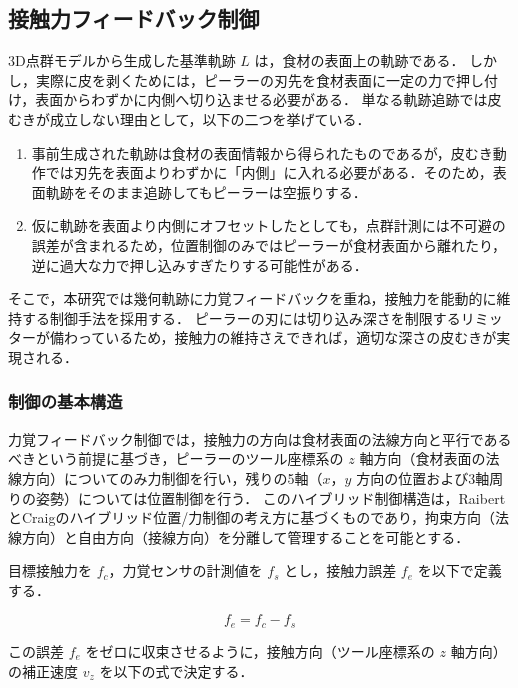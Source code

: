 \subsection{接触力フィードバック制御}
\label{sec:peeling_force_feedback}

3D点群モデルから生成した基準軌跡 $L$ は，食材の表面上の軌跡である．
しかし，実際に皮を剥くためには，ピーラーの刃先を食材表面に一定の力で押し付け，表面からわずかに内側へ切り込ませる必要がある．
単なる軌跡追跡では皮むきが成立しない理由として，以下の二つを挙げている．

\begin{enumerate}
  \item 事前生成された軌跡は食材の表面情報から得られたものであるが，皮むき動作では刃先を表面よりわずかに「内側」に入れる必要がある．そのため，表面軌跡をそのまま追跡してもピーラーは空振りする．
  \item 仮に軌跡を表面より内側にオフセットしたとしても，点群計測には不可避の誤差が含まれるため，位置制御のみではピーラーが食材表面から離れたり，逆に過大な力で押し込みすぎたりする可能性がある．
\end{enumerate}

そこで，本研究では幾何軌跡に力覚フィードバックを重ね，接触力を能動的に維持する制御手法を採用する．
ピーラーの刃には切り込み深さを制限するリミッターが備わっているため，接触力の維持さえできれば，適切な深さの皮むきが実現される．

\subsubsection{制御の基本構造}

力覚フィードバック制御では，接触力の方向は食材表面の法線方向と平行であるべきという前提に基づき，ピーラーのツール座標系の $z$ 軸方向（食材表面の法線方向）についてのみ力制御を行い，残りの5軸（$x$，$y$ 方向の位置および3軸周りの姿勢）については位置制御を行う．
このハイブリッド制御構造は，RaibertとCraig\cite{RaibertCraig1981Hybrid}のハイブリッド位置/力制御の考え方に基づくものであり，拘束方向（法線方向）と自由方向（接線方向）を分離して管理することを可能とする．

目標接触力を $f_c$，力覚センサの計測値を $f_s$ とし，接触力誤差 $f_e$ を以下で定義する．

\begin{equation}
  f_e = f_c - f_s
  \label{eq:peeling_force_error}
\end{equation}

この誤差 $f_e$ をゼロに収束させるように，接触方向（ツール座標系の $z$ 軸方向）の補正速度 $v_z$ を以下の式で決定する．

